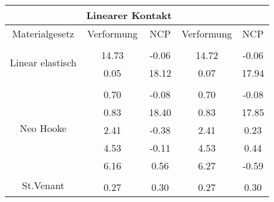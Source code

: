 \begin{table} 
\centering 
\begin{tabular}{c|cc|cc|} 
\cline{2-5} 
 & \multicolumn{2}{|c|}{Linearer Kontakt} &  \\ 
\hline 
\multicolumn{1}{|c|}{Materialgesetz} & \multicolumn{1}{c|}{Verformung} & \multicolumn{1}{c|}{NCP} & \multicolumn{1}{c|}{Verformung} & \multicolumn{1}{c|}{NCP} \\ 
\hline 
\multicolumn{1}{|c|}{\multirow{3}{*}{Linear elastisch}} &\multicolumn{1}{|c|}{} & \multicolumn{1}{|c|}{} & \multicolumn{1}{|c|}{} & \multicolumn{1}{|c|}{} \\ 
\multicolumn{1}{|c|}{} & \multicolumn{1}{|c|}{     14.73} & \multicolumn{1}{|c|}{     -0.06} & \multicolumn{1}{|c|}{     14.72} & \multicolumn{1}{|c|}{     -0.06} \\ 
\multicolumn{1}{|c|}{} & \multicolumn{1}{|c|}{      0.05} & \multicolumn{1}{|c|}{     18.12} & \multicolumn{1}{|c|}{      0.07} & \multicolumn{1}{|c|}{     17.94} \\ 
\hline 
\multicolumn{1}{|c|}{\multirow{6}{*}{Neo Hooke}} &\multicolumn{1}{|c|}{} & \multicolumn{1}{|c|}{} & \multicolumn{1}{|c|}{} & \multicolumn{1}{|c|}{} \\ 
\multicolumn{1}{|c|}{} & \multicolumn{1}{|c|}{      0.70} & \multicolumn{1}{|c|}{     -0.08} & \multicolumn{1}{|c|}{      0.70} & \multicolumn{1}{|c|}{     -0.08} \\ 
\multicolumn{1}{|c|}{} & \multicolumn{1}{|c|}{      0.83} & \multicolumn{1}{|c|}{     18.40} & \multicolumn{1}{|c|}{      0.83} & \multicolumn{1}{|c|}{     17.85} \\ 
\multicolumn{1}{|c|}{} & \multicolumn{1}{|c|}{      2.41} & \multicolumn{1}{|c|}{     -0.38} & \multicolumn{1}{|c|}{      2.41} & \multicolumn{1}{|c|}{      0.23} \\ 
\multicolumn{1}{|c|}{} & \multicolumn{1}{|c|}{      4.53} & \multicolumn{1}{|c|}{     -0.11} & \multicolumn{1}{|c|}{      4.53} & \multicolumn{1}{|c|}{      0.44} \\ 
\multicolumn{1}{|c|}{} & \multicolumn{1}{|c|}{      6.16} & \multicolumn{1}{|c|}{      0.56} & \multicolumn{1}{|c|}{      6.27} & \multicolumn{1}{|c|}{     -0.59} \\ 
\hline 
\multicolumn{1}{|c|}{\multirow{6}{*}{St.Venant}} &\multicolumn{1}{|c|}{} & \multicolumn{1}{|c|}{} & \multicolumn{1}{|c|}{} & \multicolumn{1}{|c|}{} \\ 
\multicolumn{1}{|c|}{} & \multicolumn{1}{|c|}{      0.27} & \multicolumn{1}{|c|}{      0.30} & \multicolumn{1}{|c|}{      0.27} & \multicolumn{1}{|c|}{      0.30} \\ 

\end{tabular}
\end{table}
